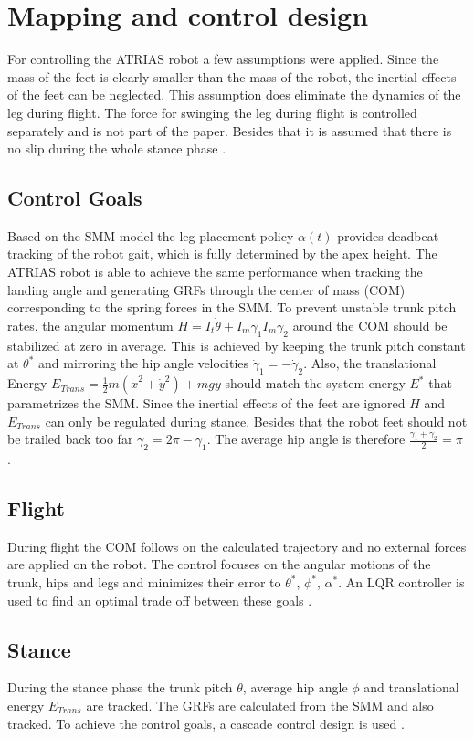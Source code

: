 \documentclass[10pt, conference]{IEEEtran}
\begin{document}
\section{Mapping and control design}
For controlling the ATRIAS robot a few assumptions were applied. Since the mass of the feet is clearly smaller than the mass of the robot, the inertial effects of 
the feet can be neglected. This assumption does eliminate the dynamics of the leg during flight. The force for swinging the leg during flight is controlled separately 
and is not part of the paper. Besides that it is assumed that there is no slip during the whole stance phase \cite{Wu2014}.

\subsection{Control Goals}
Based on the SMM model the leg placement policy \({\alpha}(t)\) provides deadbeat tracking of the robot gait, which is fully determined by the apex height. The ATRIAS 
robot is able to achieve the same performance when tracking the landing angle and generating GRFs through the center of mass (COM) corresponding to the spring forces 
in the SMM. To prevent unstable trunk pitch rates, the angular momentum  \(H={I}_{t}\dot{\theta}+{I}_m\dot{\gamma}_{1}{I}_m\dot{\gamma}_{2}\) around the COM should be 
stabilized at zero in average. This is achieved by keeping the trunk pitch constant 
at \({\theta}^{*}\) and mirroring the hip angle velocities \(\dot{\gamma}_{1} = -\dot{\gamma}_{2}\). Also, the translational Energy 
\({E}_{Trans}=\frac{1}{2}m(\dot{x}^{2}+\dot{y}^{2})+mgy\) should match the system energy \({E}^{*}\) that parametrizes the SMM. Since the inertial effects 
of the feet are ignored \(H\) and \({E}_{Trans}\) can only be regulated during stance. Besides that the robot feet should not be trailed back too far \({\gamma}_{2}=2{\pi}-{\gamma}_{1}\). 
The average hip angle is therefore \(\frac{{\gamma}_{1}+{\gamma}_{2}}{2}={\pi}\) \cite{Wu2014}.
\subsection{Flight}
During flight the COM follows on the calculated trajectory and no external forces are applied on the robot. The control focuses on the angular motions of the 
trunk, hips and legs and minimizes their error to \({\theta}^{*}\), \({\phi}^{*}\), \({\alpha}^{*}\). An LQR controller is used to find an optimal trade off between these goals \cite{Wu2014}.
\subsection{Stance}
During the stance phase the trunk pitch \({\theta}\),  average hip angle \({\phi}\) and translational energy \({E}_{Trans}\) are tracked. The GRFs are calculated from the SMM and also tracked. To achieve the control goals, a cascade control design is used \cite{Wu2014}. 
\end{document}
